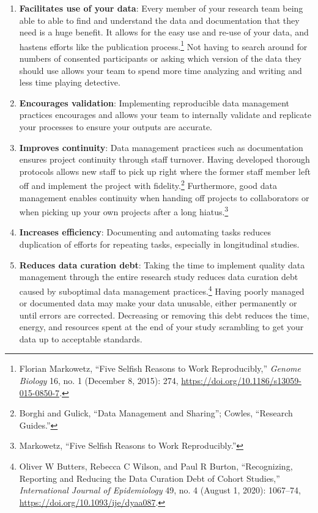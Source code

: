\documentclass[
]{book}
\begin{document}
\begin{enumerate}
\def\labelenumi{\arabic{enumi}.}
\item
  \textbf{Facilitates use of your data}: Every member of your research team being able to able to find and understand the data and documentation that they need is a huge benefit. It allows for the easy use and re-use of your data, and hastens efforts like the publication process.\footnote{Florian Markowetz, {``Five Selfish Reasons to Work Reproducibly,''} \emph{Genome Biology} 16, no. 1 (December 8, 2015): 274, \url{https://doi.org/10.1186/s13059-015-0850-7}.} Not having to search around for numbers of consented participants or asking which version of the data they should use allows your team to spend more time analyzing and writing and less time playing detective.
\item
  \textbf{Encourages validation}: Implementing reproducible data management practices encourages and allows your team to internally validate and replicate your processes to ensure your outputs are accurate.
\item
  \textbf{Improves continuity}: Data management practices such as documentation ensures project continuity through staff turnover. Having developed thorough protocols allows new staff to pick up right where the former staff member left off and implement the project with fidelity.\footnote{Borghi and Gulick, {``Data Management and Sharing''}; Cowles, {``Research Guides.''}} Furthermore, good data management enables continuity when handing off projects to collaborators or when picking up your own projects after a long hiatus.\footnote{Markowetz, {``Five Selfish Reasons to Work Reproducibly.''}}
\item
  \textbf{Increases efficiency}: Documenting and automating tasks reduces duplication of efforts for repeating tasks, especially in longitudinal studies.
\item
  \textbf{Reduces data curation debt}: Taking the time to implement quality data management through the entire research study reduces data curation debt caused by suboptimal data management practices.\footnote{Oliver W Butters, Rebecca C Wilson, and Paul R Burton, {``Recognizing, Reporting and Reducing the Data Curation Debt of Cohort Studies,''} \emph{International Journal of Epidemiology} 49, no. 4 (August 1, 2020): 1067--74, \url{https://doi.org/10.1093/ije/dyaa087}.} Having poorly managed or documented data may make your data unusable, either permanently or until errors are corrected. Decreasing or removing this debt reduces the time, energy, and resources spent at the end of your study scrambling to get your data up to acceptable standards.

\end{enumerate}
\end{document}

